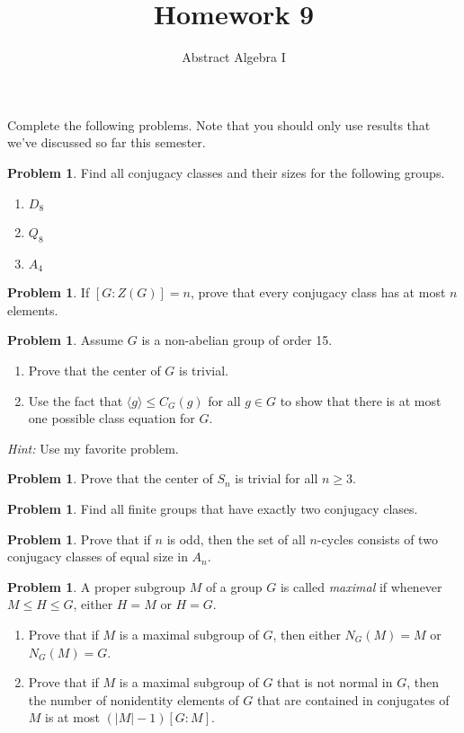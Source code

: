 \documentclass[11pt]{scrartcl}
\theoremstyle{definition}
\newtheorem{problem}[theorem]{Problem}
\begin{document}
\title{Homework 9}
\subtitle{Abstract Algebra I}
\date{}

\maketitle
\thispagestyle{fancy}

Complete the following problems. Note that you should only use results that we've discussed so far this semester.

\begin{problem}
Find all conjugacy classes and their sizes for the following groups.
\begin{enumerate}[label=\rm{(\alph*)}]
\item $D_8$
\item $Q_8$
\item $A_4$
\end{enumerate}
\end{problem}

\begin{problem}
If $[G:Z(G)]=n$, prove that every conjugacy class has at most $n$ elements.
\end{problem}

\begin{problem}
Assume $G$ is a non-abelian group of order 15.
\begin{enumerate}[label=\rm{(\alph*)}]
\item Prove that the center of $G$ is trivial.
\item Use the fact that $\langle g\rangle \leq C_G(g)$ for all $g\in G$ to show that there is at most one possible class equation for $G$. 
\end{enumerate}
\emph{Hint:} Use my favorite problem.
\end{problem}

\begin{problem}
Prove that the center of $S_n$ is trivial for all $n\geq 3$.
\end{problem}

\begin{problem}
Find all finite groups that have exactly two conjugacy clases.
\end{problem}

\begin{problem}
Prove that if $n$ is odd, then the set of all $n$-cycles consists of two conjugacy classes of equal size in $A_n$.
\end{problem}

\begin{problem}
A proper subgroup $M$ of a group $G$ is called \emph{maximal} if whenever $M\leq H\leq G$, either $H=M$ or $H=G$. 
\begin{enumerate}[label=\rm{(\alph*)}]
\item Prove that if $M$ is a maximal subgroup of $G$, then either $N_G(M)=M$ or $N_G(M)=G$.
\item Prove that if $M$ is a maximal subgroup of $G$ that is not normal in $G$, then the number of nonidentity elements of $G$ that are contained in conjugates of $M$ is at most $(|M|-1)[G:M]$.
\end{enumerate}
\end{problem}
\end{document}
